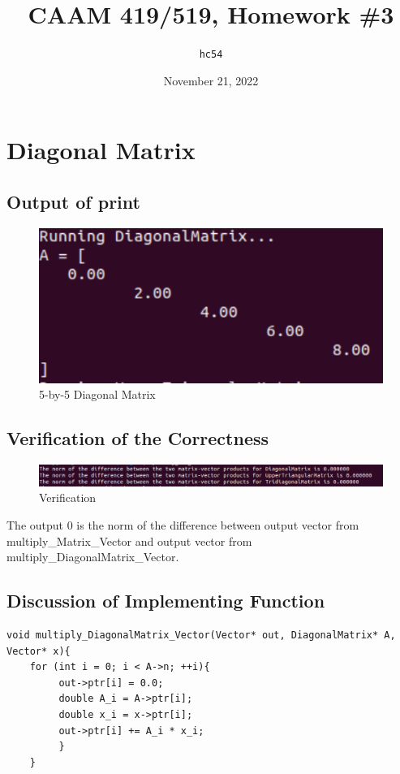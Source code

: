 \documentclass[10pt,a4paper]{article}
\title{CAAM 419/519, Homework \#3}
\author{\texttt{hc54}}
\date{November 21, 2022}
\begin{document}
\maketitle

\section{Diagonal Matrix}
\subsection{Output of print}

\begin{figure}[!ht]
        \centering \includegraphics[scale=1]{figures/diagonalmatrix print.png}
        \caption{5-by-5 Diagonal Matrix}
\end{figure}

\subsection{Verification of the Correctness}

\begin{figure}[!ht]
        \centering \includegraphics[scale=0.8]{figures/verification.png}
        \caption{Verification}
\end{figure}

The output 0 is the norm of the difference between output vector from multiply\_Matrix\_Vector and output vector from multiply\_DiagonalMatrix\_Vector.

\subsection{Discussion of Implementing Function}

\begin{lstlisting}[]
void multiply_DiagonalMatrix_Vector(Vector* out, DiagonalMatrix* A, Vector* x){  
    for (int i = 0; i < A->n; ++i){    
         out->ptr[i] = 0.0;    
         double A_i = A->ptr[i];    
         double x_i = x->ptr[i];    
         out->ptr[i] += A_i * x_i;  
         }
    }
\end{lstlisting}
\end{document}
